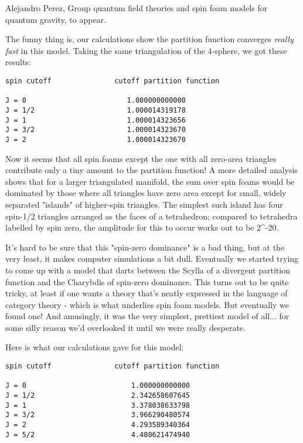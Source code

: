 Alejandro Perez, Group quantum field theories and spin foam models for
quantum gravity, to appear. 

The funny thing is, our calculations show the partition function 
converges \emph{really fast} in this model.  Taking the same triangulation 
of the 4-sphere, we got these results:

\begin{verbatim}
spin cutoff               cutoff partition function 

J = 0                        1.000000000000 
J = 1/2                      1.000014319178                 
J = 1                        1.000014323656                 
J = 3/2                      1.000014323670                 
J = 2                        1.000014323670                 
\end{verbatim}
    
Now it seems that all spin foams except the one with all zero-area
triangles contribute only a tiny amount to the partition function!  
A more detailed analysis shows that for a larger triangulated manifold,
the sum over spin foams would be dominated by those where all triangles
have zero area except for small, widely separated "islands" of
higher-spin triangles.  The simplest such island has four spin-1/2
triangles arranged as the faces of a tetrahedron; compared to tetrahedra
labelled by spin zero, the amplitude for this to occur works out to be 
2^{-20}.  

It's hard to be sure that this "spin-zero dominance" is a bad
thing, but at the very least, it makes computer simulations a bit dull.
Eventually we started trying to come up with a model that darts between
the Scylla of a divergent partition function and the Charybdis of
spin-zero dominance.  This turns out to be quite tricky, at least if one
wants a theory that's neatly expressed in the language of category
theory - which is what underlies spin foam models.  But eventually we
found one!  And amusingly, it was the very simplest, prettiest model of
all... for some silly reason we'd overlooked it until we were really
desperate.

Here is what our calculations gave for this model:

\begin{verbatim}
spin cutoff               cutoff partition function 

J = 0                         1.000000000000  
J = 1/2                       2.342658607645   
J = 1                         3.378038633798   
J = 3/2                       3.966290480574   
J = 2                         4.293589340364   
J = 5/2                       4.480621474940   
\end{verbatim}
    
